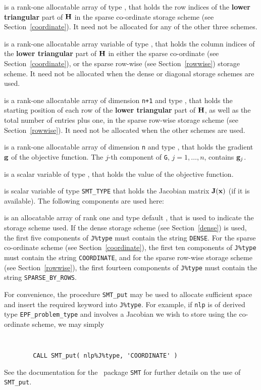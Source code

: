 \documentclass{galahad}
\newcommand{\packagename}{EPF}
\begin{document}
\begin{description}
\begin{description}
 is a rank-one allocatable array of type \integer,
that holds the row indices of the {\bf lower triangular} part of ${\mathbf{H}}$
in the sparse co-ordinate storage
scheme (see Section~\ref{coordinate}).
It need not be allocated for any of the other three schemes.

 is a rank-one allocatable array variable of type \integer,
that holds the column indices of the {\bf lower triangular} part of
${\mathbf{H}}$ in either the sparse co-ordinate
(see Section~\ref{coordinate}), or the sparse row-wise
(see Section~\ref{rowwise}) storage scheme.
It need not be allocated when the dense or diagonal storage schemes are used.

 is a rank-one allocatable array of dimension {\tt n+1} and type
\integer, that holds the starting position of
each row of the {\bf lower triangular} part of ${\mathbf{H}}$, as well
as the total number of entries plus one, in the sparse row-wise storage
scheme (see Section~\ref{rowwise}). It need not be allocated when the
other schemes are used.

\end{description}

 is a rank-one allocatable array of dimension {\tt n} and type
\realdp, that holds the gradient ${\mathbf{g}}$ of the objective function.
The $j$-th component of {\tt G}, $j = 1,  \ldots ,  n$, contains ${\mathbf{g}}_{j}$.

 is a scalar variable of type
\realdp, that holds the value of the objective function.

 is scalar variable of type {\tt SMT\_TYPE}
that holds the Jacobian matrix ${\mathbf{J}}({\mathbf{x}})$ (if it is available).
The following components are used here:

\begin{description}

 is an allocatable array of rank one and type default
\character, that
is used to indicate the storage scheme used. If the dense storage scheme
(see Section~\ref{dense}) is used,
the first five components of {\tt J\%type} must contain the
string {\tt DENSE}.
For the sparse co-ordinate scheme (see Section~\ref{coordinate}),
the first ten components of {\tt J\%type} must contain the
string {\tt COORDINATE},
and for the sparse row-wise storage scheme (see Section~\ref{rowwise}),
the first fourteen components of {\tt J\%type} must contain the
string {\tt SPARSE\_BY\_ROWS}.

For convenience, the procedure {\tt SMT\_put}
may be used to allocate sufficient space and insert the required keyword
into {\tt J\%type}.
For example, if {\tt nlp} is of derived type {\tt \packagename\_problem\_type}
and involves a Jacobian we wish to store using the co-ordinate scheme,
we may simply
{\tt
\begin{verbatim}
        CALL SMT_put( nlp%J%type, 'COORDINATE' )
\end{verbatim}
}
\noindent
See the documentation for the \galahad\ package {\tt SMT}
for further details on the use of {\tt SMT\_put}.


\end{description}
\end{description}
\end{document}
